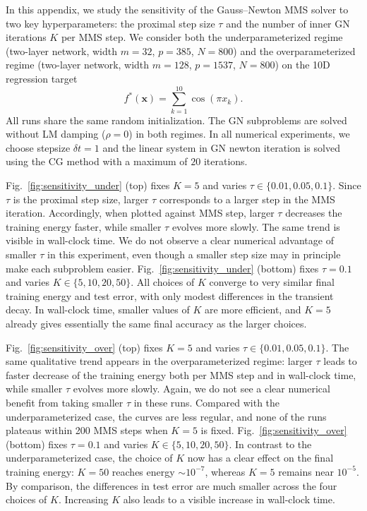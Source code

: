 \documentclass[twoside,11pt]{article}
\begin{document}
In this appendix, we study the sensitivity of the Gauss--Newton
MMS solver to two key hyperparameters: the proximal step size
$\tau$ and the number of inner GN iterations $K$ per MMS step.
We consider both the underparameterized regime (two-layer network,
width $m=32$, $p=385$, $N=800$) and the overparameterized regime
(two-layer network, width $m=128$, $p=1537$, $N=800$) on the 10D
regression target
\[
f^*(\boldsymbol{x}) = \sum_{k=1}^{10}\cos(\pi x_k).
\]
All runs share the same random initialization. The GN
subproblems are solved without LM damping ($\rho=0$) in both
regimes. In all numerical experiments, we choose stepsize $\delta t = 1$ and the linear system in GN newton iteration is solved using the CG method with a maximum of $20$ iterations.



Fig.~\ref{fig:sensitivity_under} (top) fixes $K=5$ and varies
$\tau \in \{0.01,0.05,0.1\}$. Since $\tau$ is the proximal step
size, larger $\tau$ corresponds to a larger step in the MMS
iteration. Accordingly, when plotted against MMS step, larger
$\tau$ decreases the training energy faster, while smaller $\tau$
evolves more slowly. The same trend is visible in wall-clock time.
We do not observe a clear numerical advantage of smaller $\tau$ in
this experiment, even though a smaller step size may in principle
make each subproblem easier. Fig.~\ref{fig:sensitivity_under} (bottom) fixes $\tau=0.1$ and
varies $K \in \{5,10,20,50\}$. All choices of $K$ converge to very
similar final training energy and test error, with only modest
differences in the transient decay. In wall-clock time, smaller
values of $K$ are more efficient, and $K=5$ already gives
essentially the same final accuracy as the larger choices.

Fig.~\ref{fig:sensitivity_over} (top) fixes $K=5$ and varies
$\tau \in \{0.01,0.05,0.1\}$. The same qualitative trend appears in
the overparameterized regime: larger $\tau$ leads to faster
decrease of the training energy both per MMS step and in
wall-clock time, while smaller $\tau$ evolves more slowly. Again,
we do not see a clear numerical benefit from taking smaller
$\tau$ in these runs. Compared with the underparameterized case,
the curves are less regular, and none of the runs plateaus within
200 MMS steps when $K=5$ is fixed. Fig.~\ref{fig:sensitivity_over} (bottom) fixes $\tau=0.1$ and
varies $K \in \{5,10,20,50\}$. In contrast to the
underparameterized case, the choice of $K$ now has a clear effect
on the final training energy: $K=50$ reaches energy
$\sim 10^{-7}$, whereas $K=5$ remains near $10^{-5}$. By
comparison, the differences in test error are much smaller across
the four choices of $K$. Increasing $K$ also leads to a visible
increase in wall-clock time.
\fi
\end{document}
